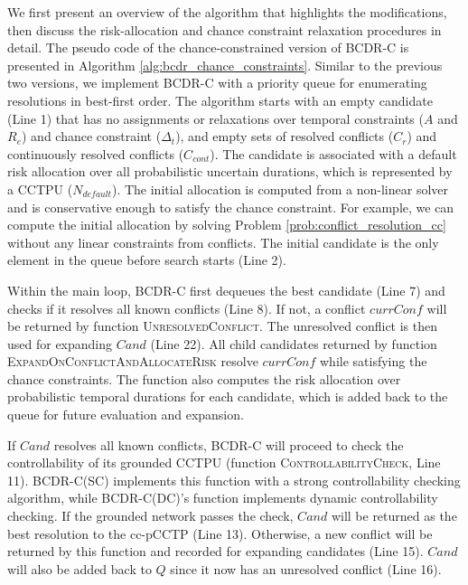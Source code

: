 \documentclass[jair,twoside,11pt,theapa]{article}
\begin{document}
We first present an overview of the algorithm that highlights the modifications,
then discuss the risk-allocation and chance constraint relaxation procedures in
detail. The pseudo code of the chance-constrained version of BCDR-C is presented
in Algorithm \ref{alg:bcdr_chance_constraints}. Similar to the previous two
versions, we implement BCDR-C with a priority queue for enumerating resolutions
in best-first order. The algorithm starts with an empty candidate (Line 1) that
has no assignments or relaxations over temporal constraints ($A$ and $R_{e}$)
and chance constraint ($\Delta_t$), and empty sets of resolved conflicts
($C_r$) and continuously resolved conflicts ($C_{cont}$). The candidate is associated with a default risk allocation over all
probabilistic uncertain durations, which is represented by a CCTPU
($N_{default}$). The initial allocation is computed from a non-linear solver and
is conservative enough to satisfy the chance constraint. For example, we can
compute the initial allocation by solving Problem \ref{prob:conflict_resolution_cc}
without any linear constraints from conflicts.  The initial candidate is the
only element in the queue before search starts (Line 2).


Within the main loop, BCDR-C first dequeues the best candidate (Line 7) and
checks if it resolves all known conflicts (Line 8). If not, a conflict
$\mathit{currConf}$ will be returned by function \textsc{UnresolvedConflict}. The
unresolved conflict is then used for expanding $\mathit{Cand}$ (Line 22). All child
candidates returned by function \textsc{ExpandOnConflictAndAllocateRisk} resolve
$\mathit{currConf}$ while satisfying the chance constraints. The function also computes
the risk allocation over probabilistic temporal durations for each candidate,
which is added back to the queue for future evaluation and expansion.


If $\mathit{Cand}$ resolves all known conflicts, BCDR-C will proceed to check the
controllability of its grounded CCTPU (function \textsc{ControllabilityCheck},
Line 11). BCDR-C(SC) implements this function with a strong controllability checking algorithm, while BCDR-C(DC)'s function implements dynamic controllability checking. If the grounded network passes the check, $\mathit{Cand}$ will be returned as the best resolution to the
cc-pCCTP (Line 13). Otherwise, a new conflict will be returned by this function
and recorded for expanding candidates (Line 15). $\mathit{Cand}$ will also be added back
to $Q$ since it now has an unresolved conflict (Line 16).
\end{document}
